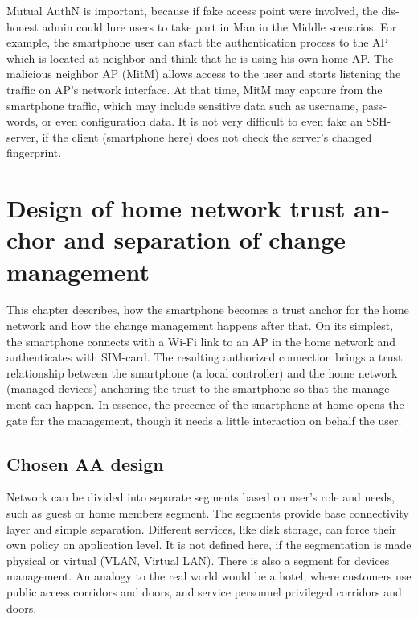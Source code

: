 \documentclass[12pt,a4paper,english]{tutthesis}
\begin{document}
\begin{otherlanguage}{english}
Mutual AuthN is important, because if fake access point were involved, the 
dishonest admin could lure users to take part in Man in the Middle scenarios.
For example, the smartphone user can start the authentication process
to the AP which is located at neighbor and think that he is using
his own home AP. 
The malicious neighbor AP (MitM) allows access to the user and starts 
listening the traffic on AP's network interface. At that time, 
MitM may capture from the smartphone  traffic, which may  include
sensitive  data such as username, passwords, or even configuration data.
It is not very difficult to even fake an SSH-server, if the 
client (smartphone here) does not check the server's changed
fingerprint.




\chapter{Design of home network trust anchor and separation of change management}
\label{sec-4}





This chapter describes, how the smartphone becomes a trust anchor for
the home network and how the change management happens after that.
On its simplest, the smartphone connects with a Wi-Fi link to an
AP in the home network and authenticates with SIM-card.
The resulting authorized connection brings a trust relationship
between the smartphone (a local controller)
and the home network (managed devices) anchoring the trust to the smartphone so that the 
management can happen. 
In essence, the precence of the smartphone at home
opens the gate for the management, though it needs a little
interaction on behalf the user.


\section{Chosen AA design}
\label{sec-4-1}
\label{sec:chosendesign}



Network can be divided into separate segments based on user's role and
needs, such as guest or home members segment. The segments provide
base connectivity layer and simple separation. Different services,
like disk storage, can force their own policy on application level.
It is not defined here, if the segmentation is made physical or
virtual (VLAN, Virtual LAN).  There is also a segment for devices
management.  An analogy to the real world would be a hotel, where
customers use public access corridors and doors, and service personnel
privileged corridors and doors.



\end{otherlanguage}
\end{document}
